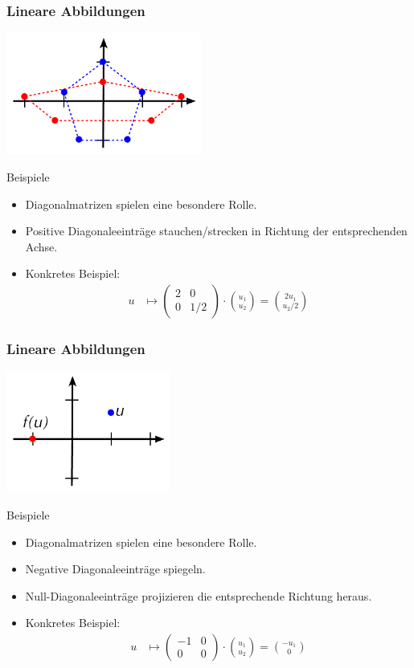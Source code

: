 \documentclass{beamer}
\renewcommand{\ae}{\"a}
\newcommand{\mytitle}{Lineare Abbildungen}
\begin{document}
\begin{frame}\frametitle{\mytitle}
	\vspace{-8mm}
	\hfill\includegraphics[height=40mm]{pics/stretch.pdf}
	\begin{block}{Beispiele}
	\begin{itemize}
	\item Diagonalmatrizen spielen eine besondere Rolle.
	\item Positive Diagonaleeintr\ae ge stauchen/strecken in Richtung der entsprechenden Achse.
	\item Konkretes Beispiel:
		\begin{align*}
			u&\mapsto\begin{pmatrix}2&0\\0&1/2\end{pmatrix}\cdot\binom{u_1}{u_2}=\binom{2u_1}{u_2/2}
		\end{align*}
	\end{itemize}
	\end{block}
\end{frame}

\begin{frame}\frametitle{\mytitle}
	\vspace{-8mm}
	\hfill\includegraphics[height=40mm]{pics/reflect.pdf}
	\begin{block}{Beispiele}
	\begin{itemize}
	\item Diagonalmatrizen spielen eine besondere Rolle.
	\item Negative Diagonaleeintr\ae ge spiegeln.
	\item Null-Diagonaleeintr\ae ge projizieren die entsprechende Richtung heraus.
	\item Konkretes Beispiel:
		\begin{align*}
			u&\mapsto\begin{pmatrix}-1&0\\0&0\end{pmatrix}\cdot\binom{u_1}{u_2}=\binom{-u_1}0
		\end{align*}
	\end{itemize}
	\end{block}
\end{frame}
\end{document}
